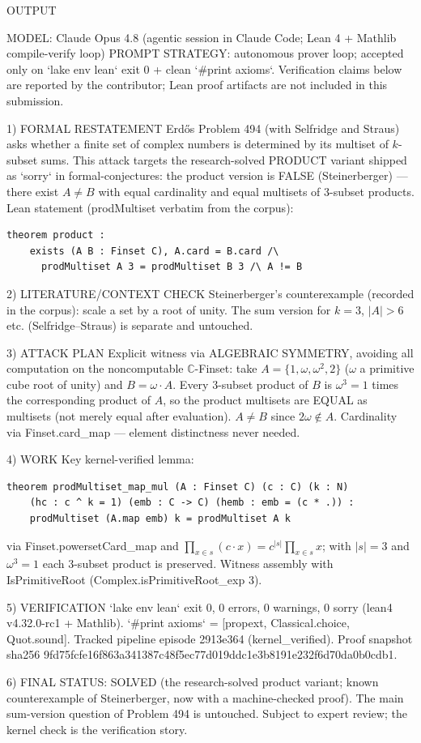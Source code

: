 
OUTPUT

MODEL: Claude Opus 4.8 (agentic session in Claude Code; Lean 4 + Mathlib compile-verify loop)
PROMPT STRATEGY: autonomous prover loop; accepted only on `lake env lean` exit 0 + clean
`#print axioms`. Verification claims below are reported by the contributor;
Lean proof artifacts are not included in this submission.

1) FORMAL RESTATEMENT
Erdős Problem 494 (with Selfridge and Straus) asks whether a finite set of complex numbers
is determined by its multiset of $k$-subset sums. This attack targets the research-solved
PRODUCT variant shipped as `sorry` in formal-conjectures: the product version is FALSE
(Steinerberger) — there exist $A \ne B$ with equal cardinality and equal multisets of
3-subset products. Lean statement (prodMultiset verbatim from the corpus):
\begin{verbatim}
theorem product :
    exists (A B : Finset C), A.card = B.card /\
      prodMultiset A 3 = prodMultiset B 3 /\ A != B
\end{verbatim}

2) LITERATURE/CONTEXT CHECK
Steinerberger's counterexample (recorded in the corpus): scale a set by a root of unity.
The sum version for $k=3$, $|A|>6$ etc. (Selfridge–Straus) is separate and untouched.

3) ATTACK PLAN
Explicit witness via ALGEBRAIC SYMMETRY, avoiding all computation on the noncomputable
$\mathbb{C}$-Finset: take $A = \{1, \omega, \omega^2, 2\}$ ($\omega$ a primitive cube
root of unity) and $B = \omega\cdot A$. Every 3-subset product of $B$ is
$\omega^3 = 1$ times the corresponding product of $A$, so the product multisets are
EQUAL as multisets (not merely equal after evaluation). $A \ne B$ since
$2\omega \notin A$. Cardinality via Finset.card_map — element distinctness never needed.

4) WORK
Key kernel-verified lemma:
\begin{verbatim}
theorem prodMultiset_map_mul (A : Finset C) (c : C) (k : N)
    (hc : c ^ k = 1) (emb : C -> C) (hemb : emb = (c * .)) :
    prodMultiset (A.map emb) k = prodMultiset A k
\end{verbatim}
via Finset.powersetCard_map and $\prod_{x\in s}(c\cdot x) = c^{|s|}\prod_{x \in s} x$;
with $|s| = 3$ and $\omega^3 = 1$ each 3-subset product is preserved. Witness assembly
with IsPrimitiveRoot (Complex.isPrimitiveRoot_exp 3).

5) VERIFICATION
`lake env lean` exit 0, 0 errors, 0 warnings, 0 sorry (lean4 v4.32.0-rc1 + Mathlib).
`#print axioms` = [propext, Classical.choice, Quot.sound].
Tracked pipeline episode 2913e364 (kernel_verified). Proof snapshot sha256
9fd75fcfe16f863a341387c48f5ec77d019ddc1e3b8191e232f6d70da0b0cdb1.

6) FINAL STATUS: SOLVED (the research-solved product variant; known counterexample of
Steinerberger, now with a machine-checked proof). The main sum-version question of
Problem 494 is untouched. Subject to expert review; the kernel check is the
verification story.
